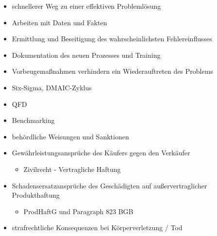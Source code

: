 \documentclass[12pt]{article}
\begin{document}
\begin{note}

    \begin{field}
        \begin{itemize}
            \item schnellerer Weg zu einer effektiven Problemlösung
            \item Arbeiten mit Daten und Fakten
            \item Ermittlung und Beseitigung des wahrscheinlichsten Fehlereinflusses
            \item Dokumentation des neuen Prozesses und Training
            \item Vorbeugemaßnahmen verhindern ein Wiederauftreten des Problems
        \end{itemize}
    \end{field}
\end{note}


\begin{note}

    \begin{field}
        \begin{itemize}
            \item Six-Sigma, DMAIC-Zyklus
            \item QFD
            \item Benchmarking
        \end{itemize}
    \end{field}
\end{note}


\begin{note}

    \begin{field}
        \begin{itemize}
            \item behördliche Weisungen und Sanktionen
            \item Gewährleistungsansprüche des Käufers gegen den Verkäufer
                \begin{itemize}
                    \item Zivilrecht - Vertragliche Haftung
                \end{itemize}
            \item Schadensersatzansprüche des Geschädigten auf außervertraglicher Produkthaftung
                \begin{itemize}
                    \item ProdHaftG und Paragraph 823 BGB
                \end{itemize}
            \item strafrechtliche Konsequenzen bei Körperverletzung / Tod
        \end{itemize}
    \end{field}
\end{note}
\end{document}
